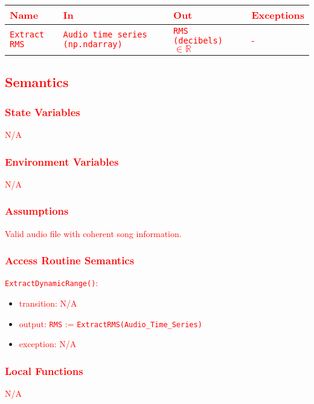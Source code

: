 \documentclass[12pt, titlepage]{article}
\begin{document}
\begin{center}
\begin{tabular}{p{2cm} p{4cm} p{4cm} p{2cm}}
\hline
\textcolor{red}{\textbf{Name}} & \textcolor{red}{\textbf{In}} & \textcolor{red}{\textbf{Out}} & \textcolor{red}{\textbf{Exceptions}}\\
\hline
\textcolor{red}{\texttt{Extract RMS}} & \textcolor{red}{\texttt{Audio time series (np.ndarray)}} & \textcolor{red}{\texttt{RMS (decibels)} $\in \mathbb{R}$} & \textcolor{red}{-}\\
\hline
\end{tabular}
\end{center}

\subsection{\textcolor{red}{Semantics}}

\subsubsection{\textcolor{red}{State Variables}}
\textcolor{red}{N/A}

\subsubsection{\textcolor{red}{Environment Variables}}
\textcolor{red}{N/A}

\subsubsection{\textcolor{red}{Assumptions}}
\textcolor{red}{Valid audio file with coherent song information.}

\subsubsection{\textcolor{red}{Access Routine Semantics}}

\noindent \textcolor{red}{\texttt{ExtractDynamicRange()}:}
\begin{itemize}
\item \textcolor{red}{transition: N/A}
\item \textcolor{red}{output: \texttt{RMS} := \texttt{ExtractRMS(Audio\_Time\_Series)}}
\item \textcolor{red}{exception: N/A}
\end{itemize}

\subsubsection{\textcolor{red}{Local Functions}}
\textcolor{red}{N/A}
\end{document}
